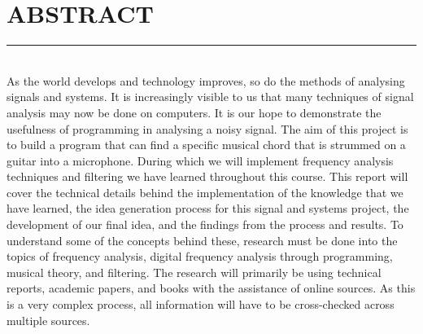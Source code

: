 \documentclass[12pt,a4paper]{article}
\begin{document}
\section{ABSTRACT}
\vspace{-5mm}
\rule{\linewidth}{0.1mm}
\vspace{5mm}\\
\normalsize
As the world develops and technology improves, so do the methods of analysing signals and systems. It is increasingly visible to us that many techniques of signal analysis may now be done on computers. It is our hope to demonstrate the usefulness of programming in analysing a noisy signal.
The aim of this project is to build a program that can find a specific musical chord that is strummed on a guitar into a microphone. During which we will implement frequency analysis techniques and filtering we have learned throughout this course. This report will cover the technical details behind the implementation of the knowledge that we have learned, the idea generation process for this signal and systems project, the development of our final idea, and the findings from the process and results. To understand some of the concepts behind these, research must be done into the topics of frequency analysis, digital frequency analysis through programming, musical theory, and filtering. The research will primarily be using technical reports, academic papers, and books with the assistance of online sources. As this is a very complex process, all information will have to be cross-checked across multiple sources.
\newpage

\Large
\end{document}
